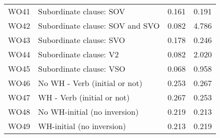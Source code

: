 \begin{longtable}{llll}
WO41 & Subordinate clause: SOV & 0.161 & 0.191\\
WO42 & Subordinate clause: SOV and SVO & 0.082 & 4.786\\
WO43 & Subordinate clause: SVO & 0.178 & 0.246\\
WO44 & Subordinate clause: V2 & 0.082 & 2.020\\
WO45 & Subordinate clause: VSO & 0.068 & 0.958\\
WO46 & No WH - Verb (initial or not) & 0.253 & 0.267\\
WO47 & WH - Verb (initial or not) & 0.267 & 0.253\\
WO48 & No WH-initial (no inversion) & 0.219 & 0.213\\
WO49 & WH-initial (no inversion) & 0.213 & 0.219\\\bottomrule
\end{longtable}
